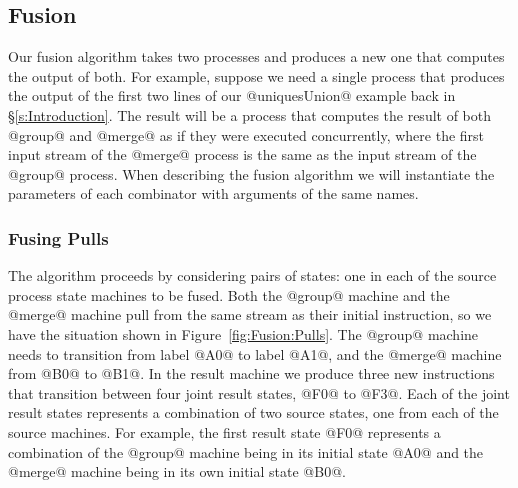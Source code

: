 

\subsection{Fusion}

Our fusion algorithm takes two processes and produces a new one that computes the output of both. For example, suppose we need a single process that produces the output of the first two lines of our @uniquesUnion@ example back in \S\ref{s:Introduction}. The result will be a process that computes the result of both @group@ and @merge@ as if they were executed concurrently, where the first input stream of the @merge@ process is the same as the input stream of the @group@ process. When describing the fusion algorithm we will instantiate the parameters of each combinator with arguments of the same names.

\subsubsection{Fusing Pulls}
\label{s:Fusion:FusingPulls}

The algorithm proceeds by considering pairs of states: one in each of the source process state machines to be fused. Both the @group@ machine and the @merge@ machine pull from the same stream as their initial instruction, so we have the situation shown in Figure~\ref{fig:Fusion:Pulls}. The @group@ machine needs to transition from label @A0@ to label @A1@, and the @merge@ machine from @B0@ to @B1@. In the result machine we produce three new instructions that transition between four joint result states, @F0@ to @F3@.
Each of the joint result states represents a combination of two source states, one from each of the source machines. For example, the first result state @F0@ represents a combination of the @group@ machine being in its initial state @A0@ and the @merge@ machine being in its own initial state @B0@. 

